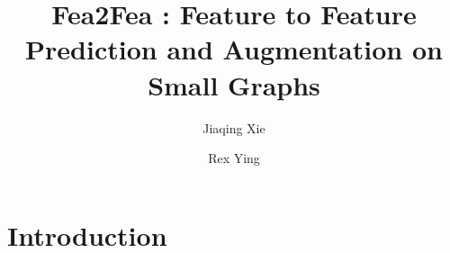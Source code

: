 \documentclass[sigconf]{acmart}
\begin{document}
\title{Fea2Fea : Feature to Feature Prediction and Augmentation on Small Graphs}


\author{Jiaqing Xie}

\author{Rex Ying}



\begin{abstract}
 
\end{abstract}





\maketitle

\section{Introduction}
\end{document}
